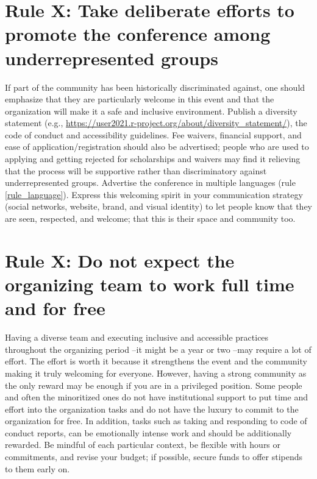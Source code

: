 \documentclass[10pt,letterpaper]{article}
\begin{document}
\section{Rule X: Take deliberate efforts to promote the conference among underrepresented groups}

If part of the community has been historically discriminated against, one should emphasize that they are particularly welcome in this event and that the organization will make it a safe and inclusive environment. Publish a diversity statement (e.g., \url{https://user2021.r-project.org/about/diversity_statement/}), the code of conduct and accessibility guidelines. Fee waivers, financial support, and ease of application/registration should also be advertised; people who are used to applying and getting rejected for scholarships and waivers may find it relieving that the process will be supportive rather than discriminatory against underrepresented groups. Advertise the conference in multiple languages (rule \ref{rule_language}). Express this welcoming spirit in your communication strategy (social networks, website, brand, and visual identity) to let people know that they are seen, respected, and welcome; that this is their space and community too. 


\section{Rule X: Do not expect the organizing team to work full time and for free}

Having a diverse team and executing inclusive and accessible practices throughout the organizing period --it might be a year or two --may require a lot of effort. The effort is worth it because it strengthens the event and the community making it truly welcoming for everyone. However, having a strong community as the only reward may be enough if you are in a privileged position. Some people and often the minoritized ones do not have institutional support to put time and effort into the organization tasks and do not have the luxury to commit to the organization for free. In addition, tasks such as taking and responding to code of conduct reports, can be emotionally intense work and should be additionally rewarded. Be mindful of each particular context, be flexible with hours or commitments, and revise your budget; if possible, secure funds to offer stipends to them early on. 
\end{document}
